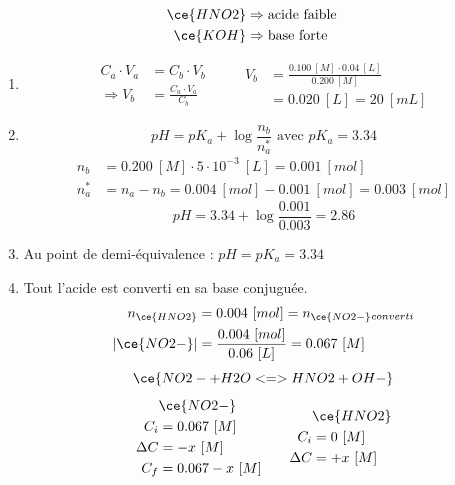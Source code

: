 \documentclass[
  11pt,
  french,
  a4paper,
  openany]{book}
\begin{document}
\begin{Answer}

\[
\begin{split}
\ce{HNO2} &\Rightarrow \text{acide faible} \\
\ce{KOH} &\Rightarrow \text{base forte}
\end{split}
\]

\begin{enumerate}
\def\labelenumi{\alph{enumi}.}
\item
  \[
  \begin{split}
  C_a \cdot V_a &= C_b \cdot V_b \\
  \Rightarrow V_b &= \frac{C_a \cdot V_a}{C_b}
  \end{split}
  \qquad
  \begin{split}
  V_b &= \frac{0.100\ [M] \cdot 0.04\ [L]}{0.200\ [M]} \\
  &= 0.020\ [L] = 20\ [mL]
  \end{split}
  \]
\item
  \[
  pH = pK_a + \log \frac{n_b}{n_a^*} \text{ avec } pK_a = 3.34
  \]
  \[
  \begin{split}
  n_b &= 0.200\ [M] \cdot 5 \cdot 10^{-3}\ [L] = 0.001\ [mol] \\
  n_a^* &= n_a - n_b = 0.004\ [mol] - 0.001\ [mol] = 0.003\ [mol]
  \end{split}
  \]
  \[
  pH = 3.34 + \log{\frac{0.001}{0.003}} = 2.86
  \]
\item
  Au point de demi-équivalence : \(pH = pK_a = 3.34\)
\item
  Tout l'acide est converti en sa base conjuguée.
  \[
  \begin{split}
  n_{\ce{HNO2}} &= 0.004\ [mol] = n_{\ce{NO2-}} {}_{converti} \\
  |\ce{NO2-}| &= \frac{0.004\ [mol]}{0.06\ [L]} = 0.067\ [M]
  \end{split}
  \]
  \[
  \ce{NO2- + H2O <=> HNO2 + OH-}
  \]
  \[
  \begin{split}
  &\ce{NO2-}\\
  C_i &= 0.067\ [M] \\
  \Delta C &= - x\ [M] \\
  C_f &= 0.067 - x\ [M] \\
  \end{split}
  \qquad
  \begin{split}
  &\ce{HNO2}\\
  C_i &= 0\ [M] \\
  \Delta C &= + x\ [M] \\

\end{split}\]
\end{enumerate}
\end{Answer}
\end{document}
